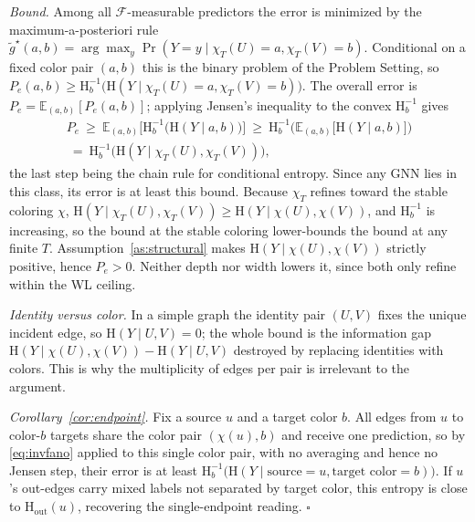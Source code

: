 \documentclass[sigconf, review, anonymous]{acmart}
\newcommand{\Hh}{\mathrm{H}}
\newcommand{\outdeg}{\mathrm{out}}
\theoremstyle{plain}
\theoremstyle{definition}
\begin{document}
\emph{Bound.} Among all $\mathcal{F}$-measurable predictors the error is minimized by the maximum-a-posteriori rule $\tilde g^\star(a,b)=\arg\max_y \Pr(Y=y\mid \chi_T(U)=a,\chi_T(V)=b)$. Conditional on a fixed color pair $(a,b)$ this is the binary problem of the Problem Setting, so $P_e(a,b)\ge \Hh_b^{-1}\big(\Hh(Y\mid \chi_T(U)=a,\chi_T(V)=b)\big)$. The overall error is $P_e=\mathbb{E}_{(a,b)}[P_e(a,b)]$; applying Jensen's inequality to the convex $\Hh_b^{-1}$ gives
\begin{multline*}
P_e \ \ge\ \mathbb{E}_{(a,b)}\Big[\Hh_b^{-1}\big(\Hh(Y\mid a,b)\big)\Big] \ \ge\ \Hh_b^{-1}\Big(\mathbb{E}_{(a,b)}\big[\Hh(Y\mid a,b)\big]\Big) \\
\ =\ \Hh_b^{-1}\big(\Hh(Y\mid \chi_T(U),\chi_T(V))\big),
\end{multline*}
the last step being the chain rule for conditional entropy. Since any GNN lies in this class, its error is at least this bound. Because $\chi_T$ refines toward the stable coloring $\chi$, $\Hh(Y\mid \chi_T(U),\chi_T(V))\ge \Hh(Y\mid \chi(U),\chi(V))$, and $\Hh_b^{-1}$ is increasing, so the bound at the stable coloring lower-bounds the bound at any finite $T$. Assumption~\ref{as:structural} makes $\Hh(Y\mid \chi(U),\chi(V))$ strictly positive, hence $P_e>0$. Neither depth nor width lowers it, since both only refine within the WL ceiling.

\emph{Identity versus color.} In a simple graph the identity pair $(U,V)$ fixes the unique incident edge, so $\Hh(Y\mid U,V)=0$; the whole bound is the information gap $\Hh(Y\mid \chi(U),\chi(V))-\Hh(Y\mid U,V)$ destroyed by replacing identities with colors. This is why the multiplicity of edges per pair is irrelevant to the argument.

\emph{Corollary~\ref{cor:endpoint}.} Fix a source $u$ and a target color $b$. All edges from $u$ to color-$b$ targets share the color pair $(\chi(u),b)$ and receive one prediction, so by \eqref{eq:invfano} applied to this single color pair, with no averaging and hence no Jensen step, their error is at least $\Hh_b^{-1}\big(\Hh(Y\mid \text{source}{=}u,\text{target color}{=}b)\big)$. If $u$'s out-edges carry mixed labels not separated by target color, this entropy is close to $\Hh_\outdeg(u)$, recovering the single-endpoint reading. $\square$
\end{document}
